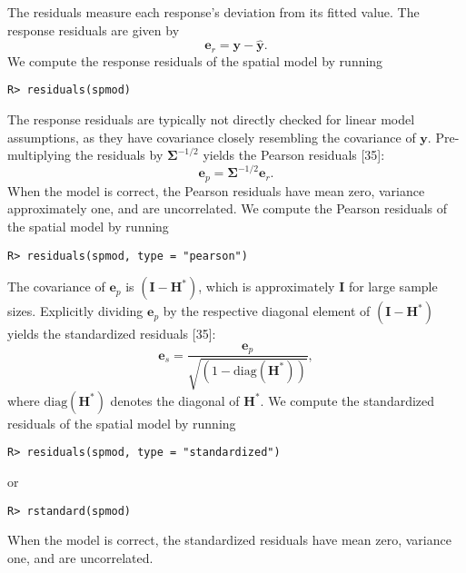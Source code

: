 \documentclass[10pt,letterpaper]{article}
\begin{document}
The residuals measure each response's deviation from its fitted value.
The response residuals are given by \begin{equation*}
  \mathbf{e}_{r} = \mathbf{y} - \hat{\mathbf{y}}.
\end{equation*} We compute the response residuals of the spatial model
by running

\begin{verbatim}
R> residuals(spmod)
\end{verbatim}

\noindent The response residuals are typically not directly checked for
linear model assumptions, as they have covariance closely resembling the
covariance of \(\mathbf{y}\). Pre-multiplying the residuals by
\(\boldsymbol{\Sigma}^{-1/2}\) yields the Pearson residuals {[}35{]}:
\begin{equation*}
  \mathbf{e}_{p} = \boldsymbol{\Sigma}^{-1/2}\mathbf{e}_{r}.
\end{equation*} When the model is correct, the Pearson residuals have
mean zero, variance approximately one, and are uncorrelated. We compute
the Pearson residuals of the spatial model by running

\begin{verbatim}
R> residuals(spmod, type = "pearson")
\end{verbatim}

\noindent The covariance of \(\mathbf{e}_{p}\) is
\((\mathbf{I} - \mathbf{H}^*)\), which is approximately \(\mathbf{I}\)
for large sample sizes. Explicitly dividing \(\mathbf{e}_{p}\) by the
respective diagonal element of \((\mathbf{I} - \mathbf{H}^*)\) yields
the standardized residuals {[}35{]}: \begin{equation*}
  \mathbf{e}_{s} = \frac{\mathbf{e}_{p}}{\sqrt{(1 - \text{diag}(\mathbf{H}^*))}},
\end{equation*} where \(\text{diag}(\mathbf{H}^*)\) denotes the diagonal
of \(\mathbf{H}^*\). We compute the standardized residuals of the
spatial model by running

\begin{verbatim}
R> residuals(spmod, type = "standardized")
\end{verbatim}

\noindent or

\begin{verbatim}
R> rstandard(spmod)
\end{verbatim}

\noindent When the model is correct, the standardized residuals have
mean zero, variance one, and are uncorrelated.
\end{document}
